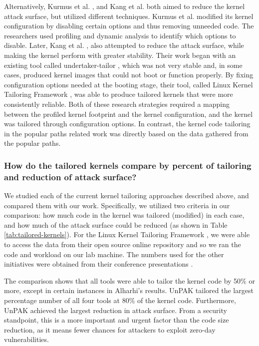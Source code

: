 Alternatively, Kurmus et al. \cite{NDSS13}, and Kang et al. \cite{Linux-Kernel-Tailoring-Framework} both aimed to reduce the kernel attack surface, 
but utilized different techniques.  Kurmus et al. modified its kernel configuration by disabling certain options and thus removing unneeded code. 
The researchers used profiling and dynamic analysis to identify which options to disable. Later, Kang et al. \cite{Linux-Kernel-Tailoring-Framework}, 
also attempted to reduce the attack surface, while making the kernel perform with greater stability. Their work began with an existing tool called undertaker-tailor \cite{NDSS13}, 
which was not very stable and, in some cases, produced kernel images that could not boot or function properly. By fixing configuration options needed at the booting stage, 
their tool, called Linux Kernel Tailoring Framework \cite{Linux-Kernel-Tailoring-Framework}, was able to produce tailored kernels that were more consistently reliable. 
Both of these research strategies required a mapping between the profiled kernel footprint and the kernel configuration, and the kernel was tailored through configuration options. 
In contrast, the kernel code tailoring in the popular paths related work was directly based on the data gathered from the popular paths.

\subsubsection{How do the tailored kernels compare by percent of tailoring and reduction of attack surface?}
\label{sec.evaluation.5.2}
We studied each of the current kernel tailoring approaches described above, and compared them with our work. 
Specifically, we utilized two criteria in our comparison: how much code in the kernel was tailored (modified) in each case, 
and how much of the attack surface could be reduced (as shown in Table \ref{tab:tailored-kernels}). For the  Linux Kernel Tailoring Framework \cite{Linux-Kernel-Tailoring-Framework}, 
we were able to access the data from their open source online repository \cite{Linux-Kernel-Tailoring-Framework} and so we ran the code and workload on our lab machine. 
The numbers used for the other initiatives were obtained from their conference presentations \cite{NDSS13}. 

The comparison shows that all tools were able to tailor the kernel code by 50\% or more, except in certain instances in Alharhi’s  \cite{SALAD18} results. 
UnPAK tailored the largest percentage number of  all four tools at 80\% of the kernel code. 
Furthermore, UnPAK achieved the largest reduction in attack surface. 
From a security standpoint, this is a more important and urgent factor than the code size reduction, as it means fewer chances for attackers to exploit zero-day vulnerabilities. 

